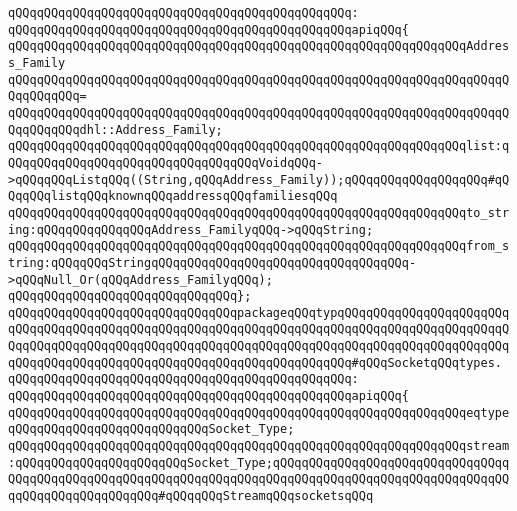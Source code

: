 \verb|qQQqqQQqqQQqqQQqqQQqqQQqqQQqqQQqqQQqqQQqqQQqqQQq:|\newline
\verb|qQQqqQQqqQQqqQQqqQQqqQQqqQQqqQQqqQQqqQQqqQQqqQQqapiqQQq{|\newline
\verb|qQQqqQQqqQQqqQQqqQQqqQQqqQQqqQQqqQQqqQQqqQQqqQQqqQQqqQQqqQQqqQQqAddress_Family|\newline
\verb|qQQqqQQqqQQqqQQqqQQqqQQqqQQqqQQqqQQqqQQqqQQqqQQqqQQqqQQqqQQqqQQqqQQqqQQqqQQqqQQq=|\newline
\verb|qQQqqQQqqQQqqQQqqQQqqQQqqQQqqQQqqQQqqQQqqQQqqQQqqQQqqQQqqQQqqQQqqQQqqQQqqQQqqQQqdhl::Address_Family;|\newline
\newline
\verb|qQQqqQQqqQQqqQQqqQQqqQQqqQQqqQQqqQQqqQQqqQQqqQQqqQQqqQQqqQQqqQQqlist:qQQqqQQqqQQqqQQqqQQqqQQqqQQqqQQqqQQqVoidqQQq->qQQqqQQqListqQQq((String,qQQqAddress_Family));qQQqqQQqqQQqqQQqqQQq#qQQqqQQqlistqQQqknownqQQqaddressqQQqfamiliesqQQq|\newline
\newline
\verb|qQQqqQQqqQQqqQQqqQQqqQQqqQQqqQQqqQQqqQQqqQQqqQQqqQQqqQQqqQQqqQQqto_string:qQQqqQQqqQQqqQQqAddress_FamilyqQQq->qQQqString;|\newline
\verb|qQQqqQQqqQQqqQQqqQQqqQQqqQQqqQQqqQQqqQQqqQQqqQQqqQQqqQQqqQQqqQQqfrom_string:qQQqqQQqStringqQQqqQQqqQQqqQQqqQQqqQQqqQQqqQQqqQQq->qQQqNull_Or(qQQqAddress_FamilyqQQq);|\newline
\verb|qQQqqQQqqQQqqQQqqQQqqQQqqQQqqQQq};|\newline
\newline
\verb|qQQqqQQqqQQqqQQqqQQqqQQqqQQqqQQqpackageqQQqtypqQQqqQQqqQQqqQQqqQQqqQQqqQQqqQQqqQQqqQQqqQQqqQQqqQQqqQQqqQQqqQQqqQQqqQQqqQQqqQQqqQQqqQQqqQQqqQQqqQQqqQQqqQQqqQQqqQQqqQQqqQQqqQQqqQQqqQQqqQQqqQQqqQQqqQQqqQQqqQQqqQQqqQQqqQQqqQQqqQQqqQQqqQQqqQQqqQQqqQQqqQQqqQQqqQQq#qQQqSocketqQQqtypes.|\newline
\verb|qQQqqQQqqQQqqQQqqQQqqQQqqQQqqQQqqQQqqQQqqQQqqQQq:|\newline
\verb|qQQqqQQqqQQqqQQqqQQqqQQqqQQqqQQqqQQqqQQqqQQqqQQqapiqQQq{|\newline
\verb|qQQqqQQqqQQqqQQqqQQqqQQqqQQqqQQqqQQqqQQqqQQqqQQqqQQqqQQqqQQqqQQqeqtypeqQQqqQQqqQQqqQQqqQQqqQQqqQQqSocket_Type;|\newline
\newline
\verb|qQQqqQQqqQQqqQQqqQQqqQQqqQQqqQQqqQQqqQQqqQQqqQQqqQQqqQQqqQQqqQQqstream:qQQqqQQqqQQqqQQqqQQqqQQqSocket_Type;qQQqqQQqqQQqqQQqqQQqqQQqqQQqqQQqqQQqqQQqqQQqqQQqqQQqqQQqqQQqqQQqqQQqqQQqqQQqqQQqqQQqqQQqqQQqqQQqqQQqqQQqqQQqqQQqqQQqqQQqqQQq#qQQqqQQqStreamqQQqsocketsqQQq|\newline
